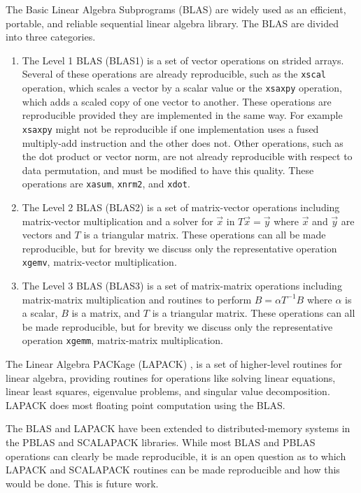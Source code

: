  The Basic Linear Algebra Subprograms (BLAS) \cite{BLAS} are widely
  used as an efficient, portable, and reliable sequential linear algebra library.
  The BLAS are divided into three categories.
  \begin{enumerate}
    \item The Level 1 BLAS (BLAS1) is a set of vector operations on
      strided arrays. Several of these operations are already
      reproducible, such as the \texttt{xscal} operation, which scales a vector by a scalar value or the \texttt{xsaxpy} operation, which adds a scaled copy of one vector to another. These operations are reproducible provided they are implemented in the same way. For example \texttt{xsaxpy} might not be reproducible if one implementation uses a fused multiply-add instruction and the other does not. Other operations, such as
      the dot product or vector norm, are not already reproducible with
      respect to data permutation, and must be modified to have this quality. These operations
      are \texttt{xasum}, \texttt{xnrm2}, and 
      \texttt{xdot}.
    \item The Level 2 BLAS (BLAS2) is a set of matrix-vector operations
      including matrix-vector multiplication and a solver for $\vec{x}$ in $T\vec{x} = \vec{y}$ where $\vec{x}$ and $\vec{y}$ are vectors and $T$ is a triangular matrix. These operations can all be made reproducible, but for brevity we discuss only the representative operation \texttt{xgemv}, matrix-vector multiplication.
    \item The Level 3 BLAS (BLAS3) is a set of matrix-matrix operations
      including matrix-matrix multiplication and routines to perform $B = \alpha T^{-1}B$ where $\alpha$ is a scalar, $B$ is a matrix, and $T$ is a triangular matrix. These operations can all be made reproducible, but for brevity we discuss only the representative operation \texttt{xgemm}, matrix-matrix multiplication.
  \end{enumerate}

  The Linear Algebra PACKage (LAPACK) \cite{LAPACK}, is a set of higher-level
  routines for linear algebra, providing routines for operations like solving linear equations, linear least squares, eigenvalue problems, and singular value decomposition. LAPACK does most floating point computation using the BLAS.

  The BLAS and LAPACK have been extended to distributed-memory systems in the PBLAS \cite{PBLAS} and SCALAPACK \cite{SCALAPACK} libraries. While most BLAS and PBLAS operations can clearly be made reproducible, it is an open question as to which LAPACK and SCALAPACK routines can be made reproducible and how this would be done. This is future work.

